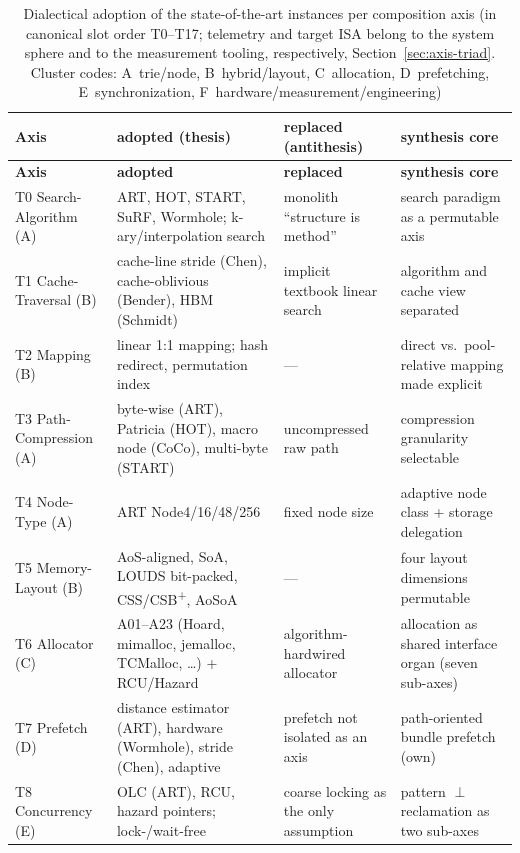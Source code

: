 {\footnotesize
\begin{longtable}{@{}p{2.3cm}p{3.7cm}p{2.7cm}p{3.6cm}@{}}
\caption{Dialectical adoption of the state-of-the-art instances per composition axis (in canonical slot order T0--T17; telemetry and target ISA belong to the system sphere and to the measurement tooling, respectively, Section~\ref{sec:axis-triad}. Cluster codes: A~trie/node, B~hybrid/layout, C~allocation, D~prefetching, E~synchronization, F~hardware/measurement/engineering)}\label{tab:dialectic}\\
\toprule
\textbf{Axis} & \textbf{adopted (thesis)} & \textbf{replaced (antithesis)} & \textbf{synthesis core} \\
\midrule
\endfirsthead%
\toprule
\textbf{Axis} & \textbf{adopted} & \textbf{replaced} & \textbf{synthesis core} \\
\midrule
\endhead%
\bottomrule
\endlastfoot%
T0 Search-Algorithm (A) & ART, HOT, START, SuRF, Wormhole; k-ary/interpolation search & monolith \enquote{structure is method} & search paradigm as a permutable axis \\
T1 Cache-Traversal (B) & cache-line stride (Chen), cache-oblivious (Bender), HBM (Schmidt) & implicit textbook linear search & algorithm and cache view separated \\
T2 Mapping (B) & linear 1:1 mapping; hash redirect, permutation index & --- & direct vs.\ pool-relative mapping made explicit \\
T3 Path-Compression (A) & byte-wise (ART), Patricia (HOT), macro node (CoCo), multi-byte (START) & uncompressed raw path & compression granularity selectable \\
T4 Node-Type (A) & ART Node4/16/48/256 & fixed node size & adaptive node class + storage delegation \\
T5 Memory-Layout (B) & AoS-aligned, SoA, LOUDS bit-packed, CSS/CSB\textsuperscript{+}, AoSoA & --- & four layout dimensions permutable \\
T6 Allocator (C) & A01--A23 (Hoard, mimalloc, jemalloc, TCMalloc, \ldots) + RCU/Hazard & algorithm-hardwired allocator & allocation as shared interface organ (seven sub-axes) \\
T7 Prefetch (D) & distance estimator (ART), hardware (Wormhole), stride (Chen), adaptive & prefetch not isolated as an axis & path-oriented bundle prefetch (own) \\
T8 Concurrency (E) & OLC (ART), RCU, hazard pointers; lock-/wait-free & coarse locking as the only assumption & pattern $\perp$ reclamation as two sub-axes \\

\end{longtable}}

